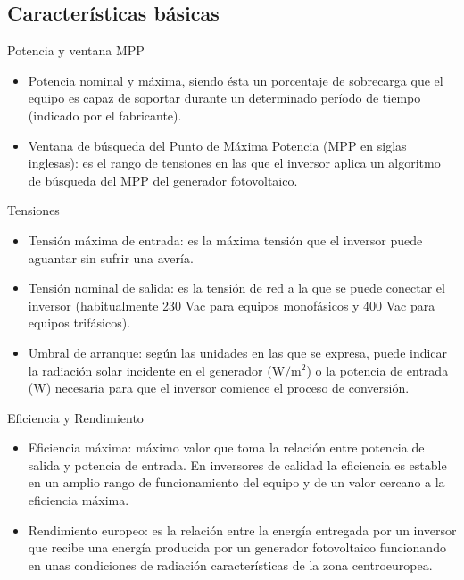 \documentclass[xcolor={usenames,svgnames,dvipsnames}]{beamer}
\begin{document}
\subsection{Características básicas}
\label{sec-2-3}
\begin{frame}[label=sec-2-3-1]{Potencia y ventana MPP}
\begin{itemize}
\item \alert{Potencia nominal y máxima}, siendo ésta un porcentaje de sobrecarga
que el equipo es capaz de soportar durante un determinado período de
tiempo (indicado por el fabricante).

\item \alert{Ventana de búsqueda del Punto de Máxima Potencia} (MPP en siglas
inglesas): es el rango de tensiones en las que el inversor aplica un
algoritmo de búsqueda del MPP del generador fotovoltaico.
\end{itemize}
\end{frame}

\begin{frame}[label=sec-2-3-2]{Tensiones}
\begin{itemize}
\item \alert{Tensión máxima de entrada}: es la máxima tensión que el inversor
puede aguantar sin sufrir una avería.

\item \alert{Tensión nominal de salida}: es la tensión de red a la que se puede
conectar el inversor (habitualmente 230 Vac para equipos monofásicos
y 400 Vac para equipos trifásicos).

\item \alert{Umbral de arranque}: según las unidades en las que se expresa, puede
indicar la radiación solar incidente en el generador
($\si{\watt\per\meter\squared}$) o la potencia de entrada (W)
necesaria para que el inversor comience el proceso de conversión.
\end{itemize}
\end{frame}

\begin{frame}[label=sec-2-3-3]{Eficiencia y Rendimiento}
\begin{itemize}
\item \alert{Eficiencia máxima}: máximo valor que toma la relación entre potencia
de salida y potencia de entrada. En inversores de calidad la
eficiencia es estable en un amplio rango de funcionamiento del equipo
y de un valor cercano a la eficiencia máxima.

\item \alert{Rendimiento europeo}: es la relación entre la energía entregada por
un inversor que recibe una energía producida por un generador
fotovoltaico funcionando en unas condiciones de radiación
características de la zona centroeuropea.
\end{itemize}
\end{frame}
\end{document}
